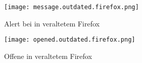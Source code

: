 \begin{figure}[!htb]
    \centering
    \begin{minipage}[b]{0.45\textwidth}
        \centering
        \texttt{[image: message.outdated.firefox.png]}
        \caption{\centering Alert bei  in veraltetem Firefox}
        \label{img:msgOldFirefoxNewComp}
    \end{minipage}
    \hfill
    \begin{minipage}[b]{0.45\textwidth}
        \centering
        \texttt{[image: opened.outdated.firefox.png]}
        \caption{\centering Offene  in veraltetem Firefox}
        \label{img:openedoldFirefoxNewComp}
    \end{minipage}
\end{figure}
